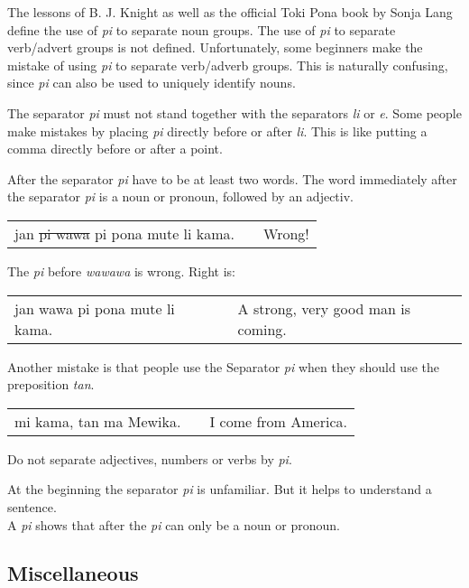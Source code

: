 The lessons of B. J. Knight as well as the official Toki Pona book by Sonja Lang define the use of \textit{pi} to separate noun groups.
The use of \textit{pi} to separate verb/advert groups is not defined.
Unfortunately, some beginners make the mistake of using \textit{pi} to separate verb/adverb groups.
This is naturally confusing, since \textit{pi}  can also be used to uniquely identify nouns.

The separator \textit{pi} must not stand together with the separators \textit{li} or \textit{e}.
Some people make mistakes by placing \textit{pi} directly before or after \textit{li}.
This is like putting a comma directly before or after a point.

After the separator \textit{pi} have to be at least two words.
The word immediately after the separator \textit{pi} is a noun or pronoun, followed by an adjectiv.

\begin{supertabular}{p{5,5cm}|ll}
    jan \sout{pi wawa} pi pona mute li kama. &  & Wrong! \\ %
\end{supertabular}

The \textit{pi} before \textit{wawawa} is wrong.
Right is:

\begin{supertabular}{p{5,5cm}|ll}
    jan wawa pi pona mute li kama. &  & A strong, very good man is coming. \\
\end{supertabular}

Another mistake is that people use the Separator \textit{pi} when they should use the preposition \textit{tan}.

\begin{supertabular}{p{5,5cm}|ll}
    mi kama, tan ma Mewika. &  & I come from America. \\
\end{supertabular}

Do not separate adjectives, numbers or verbs by \textit{pi}.

At the beginning the separator \textit{pi} is unfamiliar.
But it helps to understand a sentence. \\
A \textit{pi} shows that after the \textit{pi} can only be a noun or pronoun.

%
\newpage
\subsection*{Miscellaneous}
%
